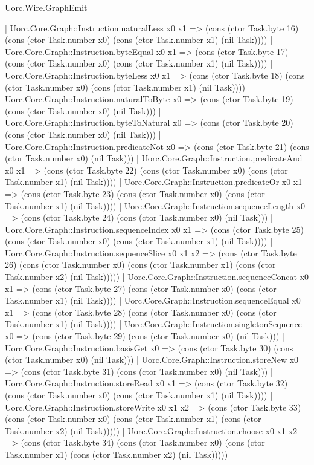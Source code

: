 \begin{lexlean}{Uorc.Wire.GraphEmit}
\begin{semanticmodule}
{    | Uorc.Core.Graph::Instruction.naturalLess x0 x1 => (cons (ctor Task.byte 16) (cons (ctor Task.number x0) (cons (ctor Task.number x1) (nil Task))))
    | Uorc.Core.Graph::Instruction.byteEqual x0 x1 => (cons (ctor Task.byte 17) (cons (ctor Task.number x0) (cons (ctor Task.number x1) (nil Task))))
    | Uorc.Core.Graph::Instruction.byteLess x0 x1 => (cons (ctor Task.byte 18) (cons (ctor Task.number x0) (cons (ctor Task.number x1) (nil Task))))
    | Uorc.Core.Graph::Instruction.naturalToByte x0 => (cons (ctor Task.byte 19) (cons (ctor Task.number x0) (nil Task)))
    | Uorc.Core.Graph::Instruction.byteToNatural x0 => (cons (ctor Task.byte 20) (cons (ctor Task.number x0) (nil Task)))
    | Uorc.Core.Graph::Instruction.predicateNot x0 => (cons (ctor Task.byte 21) (cons (ctor Task.number x0) (nil Task)))
    | Uorc.Core.Graph::Instruction.predicateAnd x0 x1 => (cons (ctor Task.byte 22) (cons (ctor Task.number x0) (cons (ctor Task.number x1) (nil Task))))
    | Uorc.Core.Graph::Instruction.predicateOr x0 x1 => (cons (ctor Task.byte 23) (cons (ctor Task.number x0) (cons (ctor Task.number x1) (nil Task))))
    | Uorc.Core.Graph::Instruction.sequenceLength x0 => (cons (ctor Task.byte 24) (cons (ctor Task.number x0) (nil Task)))
    | Uorc.Core.Graph::Instruction.sequenceIndex x0 x1 => (cons (ctor Task.byte 25) (cons (ctor Task.number x0) (cons (ctor Task.number x1) (nil Task))))
    | Uorc.Core.Graph::Instruction.sequenceSlice x0 x1 x2 => (cons (ctor Task.byte 26) (cons (ctor Task.number x0) (cons (ctor Task.number x1) (cons (ctor Task.number x2) (nil Task)))))
    | Uorc.Core.Graph::Instruction.sequenceConcat x0 x1 => (cons (ctor Task.byte 27) (cons (ctor Task.number x0) (cons (ctor Task.number x1) (nil Task))))
    | Uorc.Core.Graph::Instruction.sequenceEqual x0 x1 => (cons (ctor Task.byte 28) (cons (ctor Task.number x0) (cons (ctor Task.number x1) (nil Task))))
    | Uorc.Core.Graph::Instruction.singletonSequence x0 => (cons (ctor Task.byte 29) (cons (ctor Task.number x0) (nil Task)))
    | Uorc.Core.Graph::Instruction.basisGet x0 => (cons (ctor Task.byte 30) (cons (ctor Task.number x0) (nil Task)))
    | Uorc.Core.Graph::Instruction.storeNew x0 => (cons (ctor Task.byte 31) (cons (ctor Task.number x0) (nil Task)))
    | Uorc.Core.Graph::Instruction.storeRead x0 x1 => (cons (ctor Task.byte 32) (cons (ctor Task.number x0) (cons (ctor Task.number x1) (nil Task))))
    | Uorc.Core.Graph::Instruction.storeWrite x0 x1 x2 => (cons (ctor Task.byte 33) (cons (ctor Task.number x0) (cons (ctor Task.number x1) (cons (ctor Task.number x2) (nil Task)))))
    | Uorc.Core.Graph::Instruction.choose x0 x1 x2 => (cons (ctor Task.byte 34) (cons (ctor Task.number x0) (cons (ctor Task.number x1) (cons (ctor Task.number x2) (nil Task)))))
}
\end{semanticmodule}
\end{lexlean}
